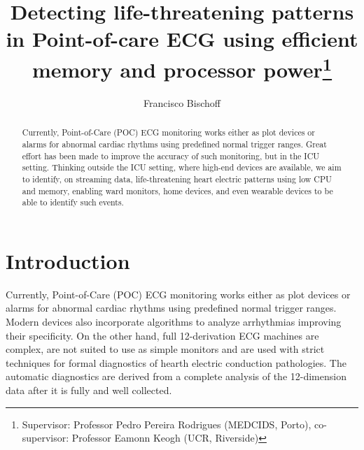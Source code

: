 \documentclass[runningheads]{llncs}
\begin{document}
%
\title{Detecting life-threatening patterns in Point-of-care ECG using efficient memory and processor power\thanks{Supervisor: Professor Pedro Pereira Rodrigues (MEDCIDS, Porto), co-supervisor: Professor Eamonn Keogh (UCR, Riverside)}}
%
%
%
\author{  Francisco Bischoff }

%


\maketitle              %
%

\begin{abstract}
  Currently, Point-of-Care (POC) ECG monitoring works either as plot devices or alarms for abnormal
  cardiac rhythms using predefined normal trigger ranges. Great effort has been made to improve the
  accuracy of such monitoring, but in the ICU setting. Thinking outside the ICU setting, where
  high-end devices are available, we aim to identify, on streaming data, life-threatening heart
  electric patterns using low CPU and memory, enabling ward monitors, home devices, and even wearable
  devices to be able to identify such events.


\end{abstract}
%
%

\hypertarget{introduction}{%
\section{Introduction}\label{introduction}}

Currently, Point-of-Care (POC) ECG monitoring works either as plot devices or alarms for abnormal
cardiac rhythms using predefined normal trigger ranges. Modern devices also incorporate algorithms
to analyze arrhythmias improving their specificity. On the other hand, full 12-derivation ECG
machines are complex, are not suited to use as simple monitors and are used with strict techniques
for formal diagnostics of hearth electric conduction pathologies. The automatic diagnostics are
derived from a complete analysis of the 12-dimension data after it is fully and well collected.
\end{document}
